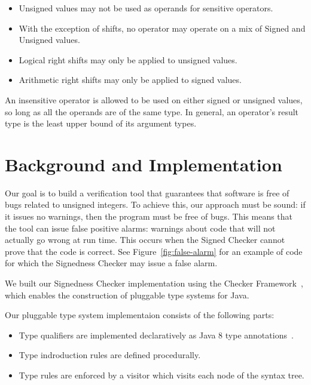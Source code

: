 \documentclass{sig-alternate-05-2015}
\begin{document}
\begin{itemize}\itemsep 0pt \parskip 0pt
  \item Unsigned values may not be used as operands for sensitive
    operators.
  \item With the exception of shifts, no operator may operate on a mix of
    Signed and Unsigned values.
  \item Logical right shifts may only be applied to unsigned values.
  \item Arithmetic right shifts may only be applied to signed values.
\end{itemize}

An insensitive operator is allowed to be used on either signed or unsigned
values, so long as all the operands are of the same type.  In general, an operator's
result type is the least upper bound of its argument types.


\section{Background and Implementation}

Our goal is to build a verification tool that guarantees that software is
free of bugs related to unsigned integers. To achieve this, our approach
must be sound:  if it issues no warnings, then the program must be free of
bugs.
This means that the tool can issue false positive alarms:  warnings about
code that will not actually go wrong at run time.  This occurs when the
Signed Checker cannot prove that the code is correct. See Figure~\ref{fig:false-alarm}
for an example of code for which the Signedness Checker may issue a false alarm.

We built our Signedness Checker implementation using the
Checker Framework~\cite{Ernst2008,DietlDEMS2011}, which enables the
construction of pluggable type systems for Java.

Our pluggable type system implementaion consists of the following parts:

\begin{itemize}\itemsep 0pt \parskip 0pt
  \item Type qualifiers are implemented declaratively as Java 8 type
    annotations~\cite{JSR308-PFD}.
  \item Type indroduction rules are defined procedurally.
  \item Type rules are enforced by a visitor which visits each node of the syntax tree.
\end{itemize}
\end{document}
